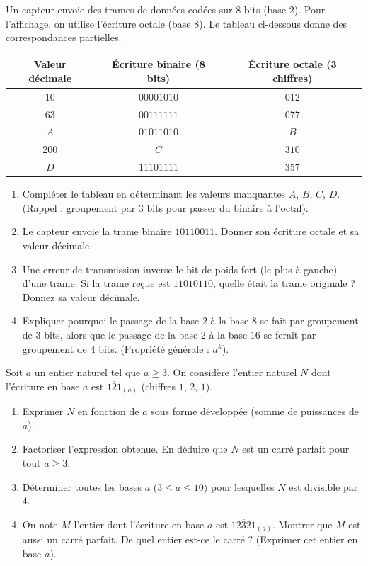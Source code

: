 \documentclass[11pt]{article}
\begin{document}
\begin{exercice}
Un capteur envoie des trames de données codées sur $8$ bits (base $2$). Pour l'affichage, on utilise l'écriture octale (base $8$). Le tableau ci-dessous donne des correspondances partielles.

\begin{center}
\begin{tabular}{|c|c|c|}
\hline
\textbf{Valeur décimale} & \textbf{Écriture binaire (8 bits)} & \textbf{Écriture octale (3 chiffres)} \\
\hline
$10$ & $00001010$ & $012$ \\
$63$ & $00111111$ & $077$ \\
$A$ & $01011010$ & $B$ \\
$200$ & $C$ & $310$ \\
$D$ & $11101111$ & $357$ \\
\hline
\end{tabular}
\end{center}

\begin{enumerate}
    \item Compléter le tableau en déterminant les valeurs manquantes $A$, $B$, $C$, $D$. (Rappel : groupement par 3 bits pour passer du binaire à l'octal).
    \item Le capteur envoie la trame binaire $10110011$. Donner son écriture octale et sa valeur décimale.
    \item Une erreur de transmission inverse le bit de poids fort (le plus à gauche) d'une trame. Si la trame reçue est $11010110$, quelle était la trame originale ? Donnez sa valeur décimale.
    \item Expliquer pourquoi le passage de la base $2$ à la base $8$ se fait par groupement de $3$ bits, alors que le passage de la base $2$ à la base $16$ se ferait par groupement de $4$ bits. (Propriété générale : $a^k$).
\end{enumerate}
\end{exercice}

\begin{exercice}
Soit $a$ un entier naturel tel que $a \ge 3$. On considère l'entier naturel $N$ dont l'écriture en base $a$ est $\overline{121}_{(a)}$ (chiffres $1$, $2$, $1$).
\begin{enumerate}
    \item Exprimer $N$ en fonction de $a$ sous forme développée (somme de puissances de $a$).
    \item Factoriser l'expression obtenue. En déduire que $N$ est un carré parfait pour tout $a \ge 3$.
    \item Déterminer toutes les bases $a$ ($3 \le a \le 10$) pour lesquelles $N$ est divisible par $4$.
    \item On note $M$ l'entier dont l'écriture en base $a$ est $\overline{12321}_{(a)}$. Montrer que $M$ est aussi un carré parfait. De quel entier est-ce le carré ? (Exprimer cet entier en base $a$).
\end{enumerate}
\end{exercice}
\end{document}
